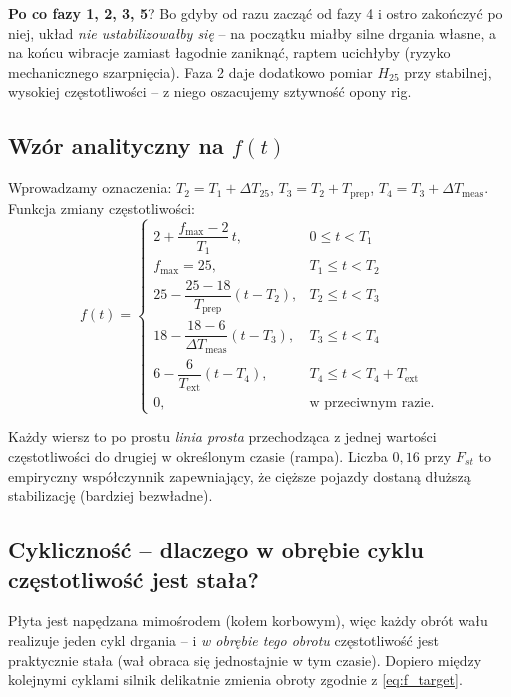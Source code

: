 \documentclass[11pt,a4paper]{article}
\theoremstyle{plainpol}
\begin{document}
\begin{intuicja}
\textbf{Po co fazy 1, 2, 3, 5}? Bo gdyby od razu zacząć od fazy 4
i ostro zakończyć po niej, układ \emph{nie ustabilizowałby się} -- na
początku miałby silne drgania własne, a na końcu wibracje zamiast
łagodnie zaniknąć, raptem ucichłyby (ryzyko mechanicznego szarpnięcia).
Faza 2 daje dodatkowo pomiar $H_{25}$ przy stabilnej, wysokiej
częstotliwości -- z niego oszacujemy sztywność opony rig.
\end{intuicja}

\subsection{Wzór analityczny na $f(t)$}

Wprowadzamy oznaczenia: $T_2 = T_1 + \Delta T_{25}$,
$T_3 = T_2 + T_{\text{prep}}$, $T_4 = T_3 + \Delta T_{\text{meas}}$.
Funkcja zmiany częstotliwości:
\begin{equation}
  f(t) =
  \begin{cases}
    2 + \dfrac{f_{\max}-2}{T_1}\,t, & 0 \leq t < T_1 \\[4pt]
    f_{\max} = 25, & T_1 \leq t < T_2 \\[4pt]
    25 - \dfrac{25-18}{T_{\text{prep}}}(t - T_2), & T_2 \leq t < T_3 \\[4pt]
    18 - \dfrac{18-6}{\Delta T_{\text{meas}}}(t - T_3), & T_3 \leq t < T_4 \\[4pt]
    6 - \dfrac{6}{T_{\text{ext}}}(t - T_4), & T_4 \leq t < T_4 + T_{\text{ext}} \\[4pt]
    0, & \text{w przeciwnym razie.}
  \end{cases}
  \label{eq:f_target}
\end{equation}

\begin{intuicja}
Każdy wiersz to po prostu \emph{linia prosta} przechodząca z jednej
wartości częstotliwości do drugiej w określonym czasie (rampa).
Liczba $0{,}16$ przy $F_{st}$ to empiryczny współczynnik zapewniający,
że cięższe pojazdy dostaną dłuższą stabilizację (bardziej bezwładne).
\end{intuicja}

\subsection{Cykliczność -- dlaczego w obrębie cyklu częstotliwość jest stała?}

Płyta jest napędzana mimośrodem (kołem korbowym), więc każdy obrót wału
realizuje jeden cykl drgania -- i \emph{w obrębie tego obrotu}
częstotliwość jest praktycznie stała (wał obraca się jednostajnie w tym
czasie). Dopiero między kolejnymi cyklami silnik delikatnie zmienia
obroty zgodnie z \cref{eq:f_target}.
\end{document}
